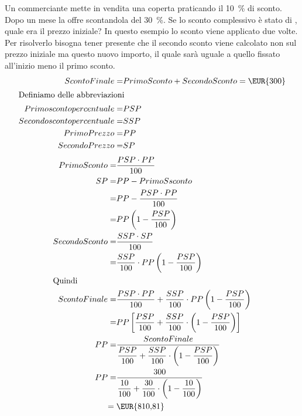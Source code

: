 \begin{exercise}%
	Un commerciante mette in vendita una coperta praticando il \SI{10}{\percent} di sconto. Dopo un mese  la offre  scontandola del \SI{30}{\percent}. Se lo sconto complessivo è stato di , quale era il prezzo iniziale?
		\tcblower
	In questo esempio lo sconto viene applicato due volte. Per risolverlo bisogna tener presente che il secondo sconto viene calcolato non sul prezzo iniziale ma questo nuovo importo, il quale sarà uguale a quello fissato all'inizio meno il primo sconto.
	\begin{align*}
		ScontoFinale=&PrimoSconto+SecondoSconto=\mbox{\EUR{300}}\\
		\intertext{Definiamo delle abbreviazioni}
		Primoscontopercentuale=&PSP\\
		Secondoscontopercentuale=&SSP\\
		PrimoPrezzo=&PP\\
		SecondoPrezzo=&SP\\
	\end{align*}
\begin{align*}
	PrimoSconto=&\dfrac{PSP\cdot PP}{100}\\
	SP=&PP-PrimoSsconto\\
	=&PP-\dfrac{PSP\cdot PP}{100}\\
	=&PP\left(1-\dfrac{PSP}{100}\right)\\
	SecondoSconto=&\dfrac{SSP\cdot SP}{100}\\
	=&\dfrac{SSP}{100}\cdot PP\left(1-\dfrac{PSP}{100}\right)\\
	\intertext{Quindi}
	ScontoFinale=&\dfrac{PSP\cdot PP}{100}+\dfrac{SSP}{100}\cdot PP\left(1-\dfrac{PSP}{100}\right)\\
	=&PP\left[\dfrac{PSP}{100}+\dfrac{SSP}{100}\cdot \left(1-\dfrac{PSP}{100}\right)\right]\\
	PP=&\dfrac{ScontoFinale}{\dfrac{PSP}{100}+\dfrac{SSP}{100}\cdot \left(1-\dfrac{PSP}{100}\right)}\\
	PP=&\dfrac{300}{\dfrac{10}{100}+\dfrac{30}{100}\cdot \left(1-\dfrac{10}{100}\right)}\\
	={}&\mbox{\EUR{810,81}}\\
\end{align*}
\end{exercise}
